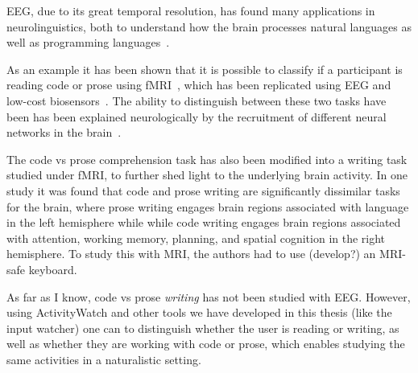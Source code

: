         EEG, due to its great temporal resolution, has found many applications in neurolinguistics, both to understand how the brain processes natural languages as well as programming languages~\cite{prat_relating_2020}.

        As an example it has been shown that it is possible to classify if a participant is reading code or prose using fMRI~\cite{floyd_decoding_2017}, which has been replicated using EEG and low-cost biosensors~\cite{fucci_replication_2019}. The ability to distinguish between these two tasks have been has been explained neurologically by the recruitment of different neural networks in the brain~\cite{ivanova_comprehension_2020}.

        The code vs prose comprehension task has also been modified into a writing task studied under fMRI, to further shed light to the underlying brain activity. In one study it was found that code and prose writing are significantly dissimilar tasks for the brain, where prose writing engages brain regions associated with language in the left hemisphere while while code writing engages brain regions associated with attention, working memory, planning, and spatial cognition in the right hemisphere\cite{noauthor_neurological_nodate}. To study this with MRI, the authors had to use (develop?) an MRI-safe keyboard.

        As far as I know, code vs prose \emph{writing} has not been studied with EEG\@. However, using ActivityWatch and other tools we have developed in this thesis (like the input watcher) one can to distinguish whether the user is reading or writing, as well as whether they are working with code or prose, which enables studying the same activities in a naturalistic setting.





